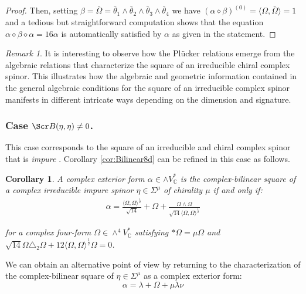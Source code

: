 \documentclass[10pt,a4paper,twoside,reqno]{amsart}
\theoremstyle{plain}
\newtheorem{cor}[thm]{Corollary}
\theoremstyle{definition}
\theoremstyle{remark}
\newtheorem{remark}[thm]{Remark}
\def\C{\mathbb{C}}
\def\scB{\Scr B}
\newcommand{\escal}[1]{\langle#1\rangle}
\begin{document}
\begin{proof}
\noindent
Then, setting $\beta=\bar\Omega=\bar\theta_1\wedge\bar\theta_2\wedge\bar\theta_3\wedge\bar\theta_4$ we have $(\alpha\diamond\beta)^{(0)}=\escal{\Omega,\bar\Omega}=1$ and a tedious but straightforward computation shows that the equation $\alpha\diamond\beta\diamond\alpha=16\alpha$ is automatically satisfied by $\alpha$ as given in the statement.
\end{proof}

\begin{remark}
It is interesting to observe how the Plücker relations emerge from the algebraic relations that characterize the square of an irreducible chiral complex spinor. This illustrates how the algebraic and geometric information contained in the general algebraic conditions for the square of an irreducible complex spinor manifests in different intricate ways depending on the dimension and signature.  
\end{remark}


\subsubsection{Case $\scB(\eta,\eta)\neq0$.}


This case corresponds to the square of an irreducible and chiral complex spinor that is \emph{impure} \cite{CharltonThesis}. Corollary \ref{cor:Bilinear8d} can be refined in this case as follows.

\begin{cor}
\label{cor:bilinear8dimpure}
A complex exterior form $\alpha\in \wedge V^*_{\C}$ is the complex-bilinear square of a complex irreducible impure spinor $\eta\in\Sigma^\mu$ of chirality $\mu$ if and only if:
\begin{eqnarray*}
\alpha =  \frac{\langle \Omega , \Omega \rangle^{\frac{1}{2}}}{\sqrt{14}} + \Omega + \frac{\Omega\wedge\Omega}{\sqrt{14} \langle \Omega , \Omega \rangle^{\frac{1}{2}}}
\end{eqnarray*}

\noindent
for a complex four-form $\Omega \in \wedge^4 V^*_\C$ satisfying $*\Omega=\mu\Omega$ and $\sqrt{14}\Omega\triangle_2\Omega + 12  \langle \Omega , \Omega \rangle^{\frac{1}{2}} \Omega = 0$.
\end{cor}

\noindent
We can obtain an alternative point of view by returning to the characterization of the complex-bilinear square of $\eta\in \Sigma^{\mu}$ as a complex exterior form:
\begin{equation*}
\alpha=\lambda + \Omega + \mu \lambda \nu    
\end{equation*}
\end{document}
